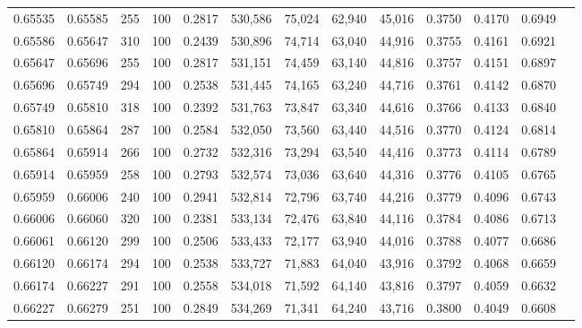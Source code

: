 \begin{tabular}{rrrrrrrrrrrrr}
0.65535 & 0.65585 &   255 & 100 &                                     0.2817 & 530,586 &  75,024 &  62,940 &  45,016 & 0.3750 & 0.4170 & 0.6949 \\
0.65586 & 0.65647 &   310 & 100 &                                     0.2439 & 530,896 &  74,714 &  63,040 &  44,916 & 0.3755 & 0.4161 & 0.6921 \\
0.65647 & 0.65696 &   255 & 100 &                                     0.2817 & 531,151 &  74,459 &  63,140 &  44,816 & 0.3757 & 0.4151 & 0.6897 \\
0.65696 & 0.65749 &   294 & 100 &                                     0.2538 & 531,445 &  74,165 &  63,240 &  44,716 & 0.3761 & 0.4142 & 0.6870 \\
0.65749 & 0.65810 &   318 & 100 &                                     0.2392 & 531,763 &  73,847 &  63,340 &  44,616 & 0.3766 & 0.4133 & 0.6840 \\
0.65810 & 0.65864 &   287 & 100 &                                     0.2584 & 532,050 &  73,560 &  63,440 &  44,516 & 0.3770 & 0.4124 & 0.6814 \\
0.65864 & 0.65914 &   266 & 100 &                                     0.2732 & 532,316 &  73,294 &  63,540 &  44,416 & 0.3773 & 0.4114 & 0.6789 \\
0.65914 & 0.65959 &   258 & 100 &                                     0.2793 & 532,574 &  73,036 &  63,640 &  44,316 & 0.3776 & 0.4105 & 0.6765 \\
0.65959 & 0.66006 &   240 & 100 &                                     0.2941 & 532,814 &  72,796 &  63,740 &  44,216 & 0.3779 & 0.4096 & 0.6743 \\
0.66006 & 0.66060 &   320 & 100 &                                     0.2381 & 533,134 &  72,476 &  63,840 &  44,116 & 0.3784 & 0.4086 & 0.6713 \\
0.66061 & 0.66120 &   299 & 100 &                                     0.2506 & 533,433 &  72,177 &  63,940 &  44,016 & 0.3788 & 0.4077 & 0.6686 \\
0.66120 & 0.66174 &   294 & 100 &                                     0.2538 & 533,727 &  71,883 &  64,040 &  43,916 & 0.3792 & 0.4068 & 0.6659 \\
0.66174 & 0.66227 &   291 & 100 &                                     0.2558 & 534,018 &  71,592 &  64,140 &  43,816 & 0.3797 & 0.4059 & 0.6632 \\
0.66227 & 0.66279 &   251 & 100 &                                     0.2849 & 534,269 &  71,341 &  64,240 &  43,716 & 0.3800 & 0.4049 & 0.6608 \\

\end{tabular}
